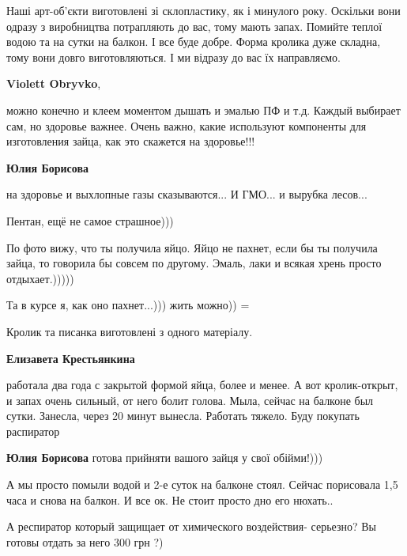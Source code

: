 \begin{itemize} %

Наші арт-об'єкти виготовлені зі склопластику, як і минулого року. Оскільки вони
одразу з виробництва потрапляють до вас, тому мають запах. Помийте теплої водою
та на сутки на балкон. І все буде добре. Форма кролика дуже складна, тому вони
довго виготовляються. І ми відразу до вас їх направляємо.

\textbf{Violett Obryvko}, 

можно конечно и клеем моментом дышать и эмалью ПФ и т.д. Каждый выбирает сам,
но здоровье важнее. Очень важно, какие используют компоненты для изготовления
зайца, как это скажется на здоровье!!!

\textbf{Юлия Борисова} 

на здоровье и выхлопные газы сказываются... И ГМО... и вырубка лесов...

Пентан, ещё не самое страшное)))


По фото вижу, что ты получила яйцо. Яйцо не пахнет, если бы ты получила зайца,
то говорила бы совсем по другому. Эмаль, лаки и всякая хрень просто
отдыхает.)))))


Та в курсе я, как оно пахнет...))) жить можно)) =


Кролик та писанка виготовлені з одного матеріалу.

\textbf{Елизавета Крестьянкина} 

работала два года с закрытой формой яйца, более и менее. А вот кролик-открыт, и
запах очень сильный, от него болит голова. Мыла, сейчас на балконе был сутки.
Занесла, через 20 минут вынесла. Работать тяжело. Буду покупать распиратор

\textbf{Юлия Борисова} готова прийняти вашого зайця у свої обійми!)))


А мы просто помыли водой и 2-е суток на балконе стоял. Сейчас порисовала 1,5
часа и снова на балкон. И все ок. Не стоит просто дно его нюхать..

А респиратор который защищает от химического воздействия- серьезно? Вы готовы
отдать за него 300 грн ?)



\end{itemize}
